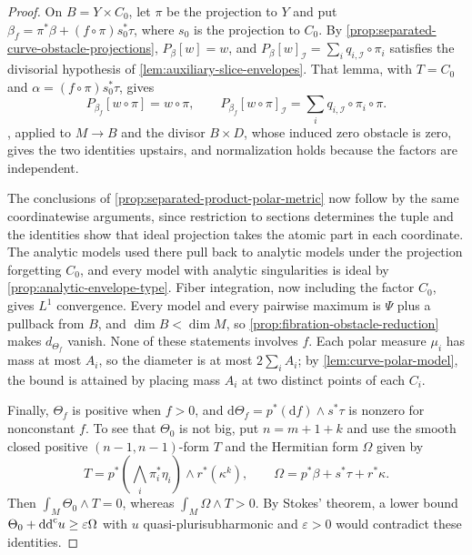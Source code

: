 \begin{proof}
On $B=Y\times C_0$, let $\pi$ be the projection to $Y$ and put $\beta_f=\pi^*\beta+(f\circ\pi)s_0^*\tau$, where $s_0$ is the projection to $C_0$. By \cref{prop:separated-curve-obstacle-projections}, $P_\beta[w]=w$, and $P_\beta[w]_{\mathcal I}=\sum_iq_{i,\mathcal I}\circ\pi_i$ satisfies the divisorial hypothesis of \cref{lem:auxiliary-slice-envelopes}. That lemma, with $T=C_0$ and $\alpha=(f\circ\pi)s_0^*\tau$, gives
\[
 P_{\beta_f}[w\circ\pi]=w\circ\pi,\qquad
 P_{\beta_f}[w\circ\pi]_{\mathcal I}=\sum_iq_{i,\mathcal I}\circ\pi_i\circ\pi.
\]
, applied to $M\to B$ and the divisor $B\times D$, whose induced zero obstacle is zero, gives the two identities upstairs, and normalization holds because the factors are independent.

The conclusions of \cref{prop:separated-product-polar-metric} now follow by the same coordinatewise arguments, since restriction to sections determines the tuple and the identities show that ideal projection takes the atomic part in each coordinate. The analytic models used there pull back to analytic models under the projection forgetting $C_0$, and every model with analytic singularities is ideal by \cref{prop:analytic-envelope-type}. Fiber integration, now including the factor $C_0$, gives $L^1$ convergence. Every model and every pairwise maximum is $\Psi$ plus a pullback from $B$, and $\dim B<\dim M$, so \cref{prop:fibration-obstacle-reduction} makes $d_{\Theta_f}$ vanish. None of these statements involves $f$. Each polar measure $\mu_i$ has mass at most $A_i$, so the diameter is at most $2\sum_iA_i$; by \cref{lem:curve-polar-model}, the bound is attained by placing mass $A_i$ at two distinct points of each $C_i$.

Finally, $\Theta_f$ is positive when $f>0$, and $\mathrm d\Theta_f=p^*(\mathrm df)\wedge s^*\tau$ is nonzero for nonconstant $f$. To see that $\Theta_0$ is not big, put $n=m+1+k$ and use the smooth closed positive $(n-1,n-1)$-form $T$ and the Hermitian form $\Omega$ given by
\[
 T=p^*\left(\bigwedge_i\pi_i^*\eta_i\right)\wedge r^*(\kappa^k),
 \qquad \Omega=p^*\beta+s^*\tau+r^*\kappa.
\]
Then $\int_M\Theta_0\wedge T=0$, whereas $\int_M\Omega\wedge T>0$. By Stokes' theorem, a lower bound $\Theta_0+\mathrm{dd}^{\mathrm{c}} u\geq\varepsilon\Omega$ with $u$ quasi-plurisubharmonic and $\varepsilon>0$ would contradict these identities.
\end{proof}










